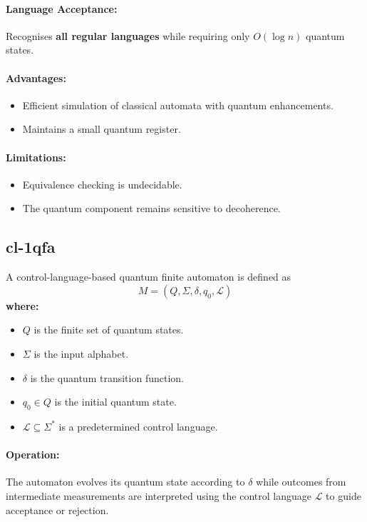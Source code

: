 \paragraph{Language Acceptance:}  
Recognises \textbf{all regular languages} while requiring only \( O(\log n) \) quantum states.

\paragraph{Advantages:}
\begin{itemize}
    \item Efficient simulation of classical automata with quantum enhancements.
    \item Maintains a small quantum register.
\end{itemize}

\paragraph{Limitations:}
\begin{itemize}
    \item Equivalence checking is undecidable.
    \item The quantum component remains sensitive to decoherence.
\end{itemize}

\subsection{\acrfull{cl-1qfa}}
\label{subsec:cl-1qfa}
\begin{definition}
A control-language-based quantum finite automaton is defined as 
\[
M = (Q, \Sigma, \delta, q_0, \mathcal{L})
\]
\textbf{where:}
\begin{itemize}
    \item \( Q \) is the finite set of quantum states.
    \item \( \Sigma \) is the input alphabet.
    \item \( \delta \) is the quantum transition function.
    \item \( q_0 \in Q \) is the initial quantum state.
    \item \( \mathcal{L} \subseteq \Sigma^* \) is a predetermined control language.
\end{itemize}
\end{definition}

\paragraph{Operation:}  
The automaton evolves its quantum state according to \( \delta \) while outcomes from intermediate measurements are interpreted using the control language \( \mathcal{L} \) to guide acceptance or rejection.

